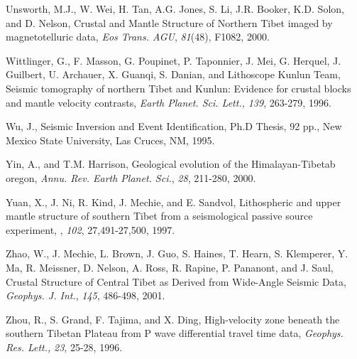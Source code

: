 \documentclass[12pt]{article}
\begin{document}
\begin{references}
Unsworth, M.J., W. Wei, H. Tan, A.G. Jones, S. Li, J.R. Booker, K.D. Solon,
and D. Nelson, Crustal and Mantle Structure of Northern Tibet imaged by
magnetotelluric data, {\it Eos Trans. AGU}, {\it 81}(48), F1082, 2000.

Wittlinger, G., F. Masson, G. Poupinet, P. Taponnier, J. Mei, G. Herquel,
J. Guilbert, U. Archauer, X. Guanqi, S. Danian, and Lithoscope Kunlun Team,
Seismic tomography of northern Tibet and Kunlun: Evidence for crustal blocks
and mantle velocity contrasts, {\it Earth Planet. Sci. Lett.,} {\it 139},
263-279, 1996.

Wu, J., Seismic Inversion and Event Identification, Ph.D Thesis, 92 pp.,
New Mexico State University, Las Cruces, NM, 1995.

Yin, A., and T.M. Harrison, Geological evolution of the 
Himalayan-Tibetab oregon, {\it Annu. Rev. Earth Planet. Sci.}, {\it 28}, 211-280, 
2000. 

Yuan, X., J. Ni, R. Kind, J. Mechie, and E. Sandvol, Lithospheric
and upper mantle structure of southern Tibet from a seismological passive
source experiment, \jgr, {\it 102}, 27,491-27,500, 1997.

Zhao, W., J. Mechie, L. Brown, J. Guo, S. Haines, T. Hearn, S. Klemperer,
Y. Ma, R. Meissner, D. Nelson, A. Ross, R. Rapine, P. Pananont, and J. Saul,
Crustal Structure of Central Tibet as Derived from Wide-Angle
Seismic Data, {\it Geophys. J. Int.}, {\it 145}, 486-498, 2001.

Zhou, R., S. Grand, F. Tajima, and X. Ding, High-velocity zone 
beneath the southern Tibetan Plateau from P wave differential travel time data,
{\it Geophys. Res. Lett.,} {\it 23}, 25-28, 1996.

\end{references}

\clearpage
\end{document}
